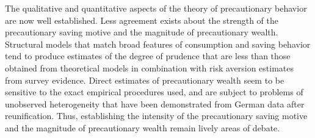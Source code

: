 
The qualitative and quantitative aspects of the theory of
precautionary behavior are now well established. Less agreement exists
about the strength of the precautionary saving motive and the
magnitude of precautionary wealth. Structural models that match broad
features of consumption and saving behavior tend to produce estimates
of the degree of prudence that are less than those obtained from
theoretical models in combination with risk aversion estimates from
survey evidence.  Direct estimates of precautionary wealth seem to be
sensitive to the exact empirical procedures used, and are subject to
problems of unobserved heterogeneity that have been demonstrated from
German data after reunification. Thus, establishing the intensity of
the precautionary saving motive and the magnitude of precautionary
wealth remain lively areas of debate.


